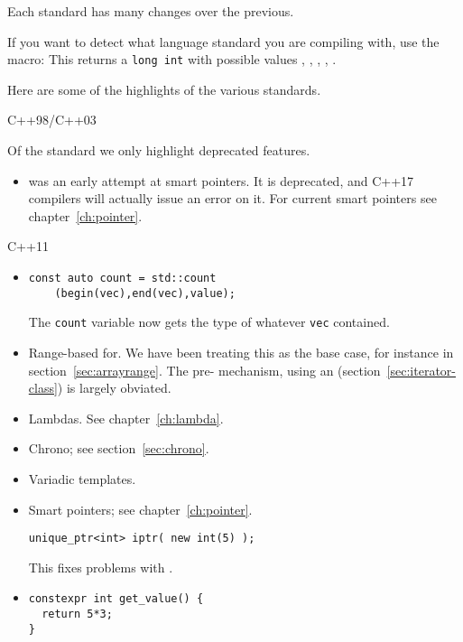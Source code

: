 Each standard has many changes over the previous.

If you want to detect what language standard you are compiling with,
use the  macro:
%
%
This returns a \lstinline{long int} with possible values
, , , , .

Here are some of the highlights of the various standards.

 {C++98/C++03}

Of the  standard
we only highlight deprecated features.
\begin{itemize}
\item {} was an early attempt at smart
  pointers. It is deprecated, and C++17 compilers will actually issue
  an error on it. For current smart pointers see chapter~\ref{ch:pointer}.
\end{itemize}

 {C++11}

\begin{itemize}
\item {}
\begin{lstlisting}
const auto count = std::count
    (begin(vec),end(vec),value);
\end{lstlisting}
The \lstinline{count} variable now gets the type of whatever
\lstinline{vec} contained.

\item  Range-based for. We have been treating this as the base case,
  for instance in section~\ref{sec:arrayrange}.
  The pre- mechanism,
  using an  (section~\ref{sec:iterator-class}) is
  largely obviated.

\item Lambdas. See chapter~\ref{ch:lambda}.

\item Chrono; see section~\ref{sec:chrono}.
\item Variadic templates.

\item Smart pointers; see chapter~\ref{ch:pointer}.
\begin{lstlisting}
unique_ptr<int> iptr( new int(5) );    
\end{lstlisting}
This fixes problems with .

\item {}
\begin{lstlisting}
constexpr int get_value() {
  return 5*3;
}
\end{lstlisting}
\end{itemize}

